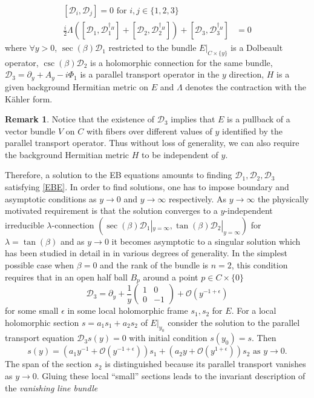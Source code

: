 \documentclass[twoside, 11pt]{article}
\numberwithin{equation}{section}
\theoremstyle{theorem}
\numberwithin{theorem}{section}
\theoremstyle{definition}
\newtheorem{remark}[remark]{Remark}
\newcommand{\pa}{\partial}
\newcommand{\D}{\mathcal D}
\begin{document}
\begin{equation}\label{EBE}
\begin{split}
[\D_i,\D_j] = 0 \text{ for } i,j\in \{1,2,3\}&\\
\frac{i}{2}\Lambda([\D_1,\D_1^{\dagger_H}] + [\D_2,\D_2^{\dagger_H}]) + [\D_3,\D_3^{\dagger_H}] &= 0
\end{split}
\end{equation}
where $\forall y>0$, $\sec(\beta)\D_1$ restricted to the bundle $E|_{C\times\{y\}}$ is a Dolbeault operator, $\csc(\beta)\D_2$ is a holomorphic connection for the same bundle, $\D_3 = \pa_y +A_y - i\Phi_1$ is a parallel transport operator in the $y$ direction, $H$ is a given background Hermitian metric on $E$ and $\Lambda$ denotes the contraction with the K\"ahler form. 

\begin{remark}
Notice that the existence of $\D_3$ implies that $E$ is a pullback of a vector bundle $V$ on $C$ with fibers over different values of $y$ identified by the parallel transport operator. Thus without loss of generality, we can also require the background Hermitian metric $H$ to be independent of $y$. 
\end{remark}

Therefore, a solution to the EB equations amounts to finding $\D_1,\D_2,\D_3$ satisfying \eqref{EBE}. In order to find solutions, one has to impose boundary and asymptotic conditions as $y\to 0$ and $y\to \infty$ respectively. As $y\to \infty$ the physically motivated requirement is that the solution converges to a $y$-independent irreducible $\lambda$-connection $(\sec(\beta)\D_1|_{y = \infty}, \tan(\beta)\D_2|_{y=\infty})$ for $\lambda = \tan(\beta)$ and as $y\to 0$ it becomes asymptotic to a singular solution which has been studied in detail in \cite{Witten2011,GW11,MW2014,Mikhaylov2012,MW2017,Dim22} in various degrees of generality. In the simplest possible case when $\beta=0$ and the rank of the bundle is $n=2$, this condition requires that in an open half ball $B_p$ around a point $p\in C\times\{0\}$ 
\begin{equation}
\D_3 = \pa_y+ \frac{1}{y}\begin{pmatrix}1 & 0\\ 0 & -1  \end{pmatrix} + \mathcal O(y^{-1+\epsilon})
\end{equation}
for some small $\epsilon$ in some local holomorphic frame $s_1,s_2$ for $E$. For a local holomorphic section $s = a_1s_1 + a_2s_2$ of $E|_{y_0}$ consider the solution to the parallel transport equation $\D_3s(y) = 0$ with initial condition $s(y_0) = s$. Then 
\begin{equation}
s(y) =  (a_1y^{-1} + \mathcal O(y^{-1+\epsilon}))s_1 + (a_2y + \mathcal O(y^{1+\epsilon}))s_2 \text{ as } y\to 0. 
\end{equation}
The span of the section $s_2$ is distinguished because its parallel transport vanishes as $y\to 0$. Gluing these local ``small'' sections leads to the invariant description of the \textit{vanishing line bundle}
\end{document}
